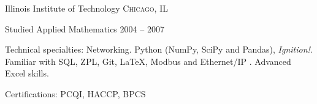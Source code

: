 \documentclass[10pt,a4paper]{article} %
\begin{document}


\spacedhrule{-0.2em}{-0.4em} %



\headedsection %
{Illinois Institute of Technology}
{\textsc{Chicago, IL}} {

\headedsubsection %
{Studied Applied Mathematics}
{2004 -- 2007}
{}}

\spacedhrule{0.5em}{-0.4em} %



\inlineheadsection %
{Technical specialties:}
{Networking. Python (NumPy, SciPy and Pandas), \textit{Ignition!}.  Familiar with SQL, ZPL, Git, \LaTeX, Modbus and Ethernet/IP . Advanced Excel skills.}
 
\inlineheadsection
{Certifications:}
{PCQI, HACCP, BPCS}


\end{document}
